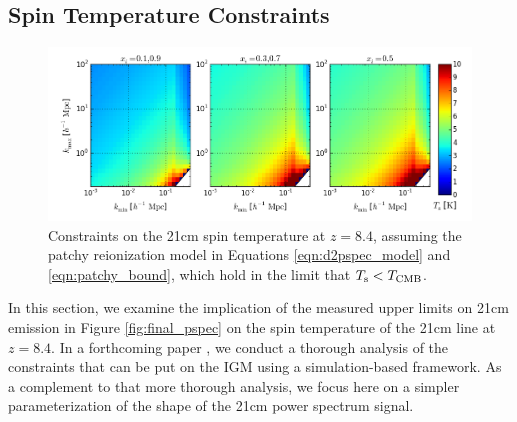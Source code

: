 \documentclass[twocolumn,numberedappendix]{emulateapj} \shorttitle{New Limits on the 21 cm Power Spectrum at $z=8.4$}
\begin{document}
\subsection{Spin Temperature Constraints}

\begin{figure}\centering
\includegraphics[width=2\columnwidth]{plots/ts_patchy_bound.png}
\caption{Constraints on the 21cm spin temperature at $z=8.4$, 
assuming 
the patchy reionization model in Equations
\eqref{eqn:d2pspec_model} and \eqref{eqn:patchy_bound}, which hold in the limit
that $T_{\rm s}<T_{\rm CMB}$.
} \label{fig:patchy_bound}
\end{figure}

In this section, we examine the implication of the measured upper limits
on 21cm emission in Figure \ref{fig:final_pspec} on the spin temperature
of the 21cm line at $z=8.4$.
In a forthcoming paper \citet{pober_et_al2015}, we conduct a thorough analysis of the
constraints that can be put on the IGM using a simulation-based framework.
As a complement to that more thorough
analysis, we focus here on a simpler parameterization of the shape
of the 21cm power spectrum signal. 
\end{document}
